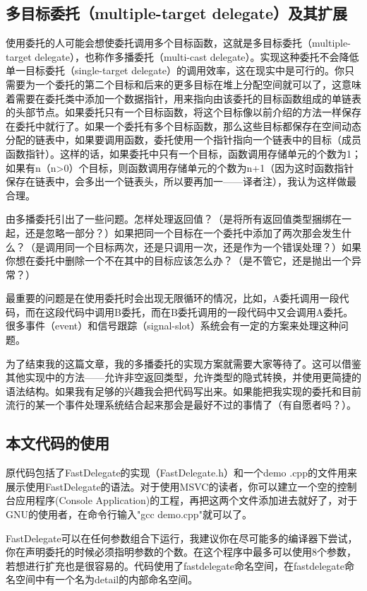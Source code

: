 \documentclass{article}
\begin{document}
\begin{CJK}{UTF8}{gbsn}
\subsection{多目标委托（multiple-target delegate）及其扩展}
使用委托的人可能会想使委托调用多个目标函数，这就是多目标委托（multiple-target delegate），也称作多播委托（multi-cast delegate）。实现这种委托不会降低单一目标委托（single-target delegate）的调用效率，这在现实中是可行的。你只需要为一个委托的第二个目标和后来的更多目标在堆上分配空间就可以了，这意味着需要在委托类中添加一个数据指针，用来指向由该委托的目标函数组成的单链表的头部节点。如果委托只有一个目标函数，将这个目标像以前介绍的方法一样保存在委托中就行了。如果一个委托有多个目标函数，那么这些目标都保存在空间动态分配的链表中，如果要调用函数，委托使用一个指针指向一个链表中的目标（成员函数指针）。这样的话，如果委托中只有一个目标，函数调用存储单元的个数为1；如果有n（n>0）个目标，则函数调用存储单元的个数为n+1（因为这时函数指针保存在链表中，会多出一个链表头，所以要再加一——译者注），我认为这样做最合理。

由多播委托引出了一些问题。怎样处理返回值？（是将所有返回值类型捆绑在一起，还是忽略一部分？）如果把同一个目标在一个委托中添加了两次那会发生什么？（是调用同一个目标两次，还是只调用一次，还是作为一个错误处理？）如果你想在委托中删除一个不在其中的目标应该怎么办？（是不管它，还是抛出一个异常？）

最重要的问题是在使用委托时会出现无限循环的情况，比如，A委托调用一段代码，而在这段代码中调用B委托，而在B委托调用的一段代码中又会调用A委托。很多事件（event）和信号跟踪（signal-slot）系统会有一定的方案来处理这种问题。

为了结束我的这篇文章，我的多播委托的实现方案就需要大家等待了。这可以借鉴其他实现中的方法——允许非空返回类型，允许类型的隐式转换，并使用更简捷的语法结构。如果我有足够的兴趣我会把代码写出来。如果能把我实现的委托和目前流行的某一个事件处理系统结合起来那会是最好不过的事情了（有自愿者吗？）。

\subsection{本文代码的使用}
原代码包括了FastDelegate的实现（FastDelegate.h）和一个demo .cpp的文件用来展示使用FastDelegate的语法。对于使用MSVC的读者，你可以建立一个空的控制台应用程序(Console Application)的工程，再把这两个文件添加进去就好了，对于GNU的使用者，在命令行输入"gcc demo.cpp"就可以了。

FastDelegate可以在任何参数组合下运行，我建议你在尽可能多的编译器下尝试，你在声明委托的时候必须指明参数的个数。在这个程序中最多可以使用8个参数，若想进行扩充也是很容易的。代码使用了fastdelegate命名空间，在fastdelegate命名空间中有一个名为detail的内部命名空间。


\end{CJK}
\end{document}
